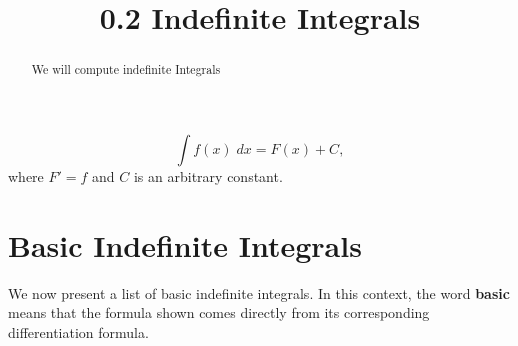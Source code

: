 \documentclass{ximera}
\title{0.2 Indefinite Integrals}
\begin{document}
\begin{abstract}
We will compute indefinite Integrals
\end{abstract}

\maketitle

\begin{definition}
\[
\int f(x) \; dx = F(x) + C,
\]
where $F' = f$ and $C$ is an arbitrary constant.

\end{definition}


\section{Basic Indefinite Integrals}

We now present a list of basic indefinite integrals.  In this context, the word \textbf{basic} means that the formula shown
comes directly from its corresponding differentiation formula.
\end{document}

